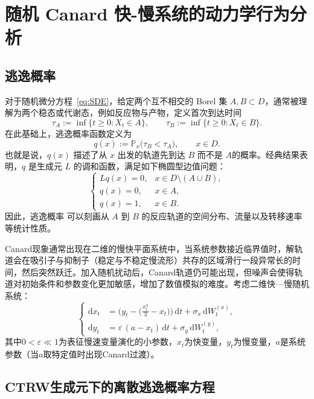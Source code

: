 	
	\section{随机 Canard 快-慢系统的动力学行为分析}
	
	\subsection{逃逸概率}
	
	对于随机微分方程~\eqref{eq:SDE}，给定两个互不相交的 Borel 集 $A,B\subset D$，通常被理解为两个稳态或代谢态，例如反应物与产物，定义首次到达时间
	\[
	\tau_A := \inf\{t\ge0 : X_t\in A\},\qquad 
	\tau_B := \inf\{t\ge0 : X_t\in B\}.
	\]
	在此基础上，逃逸概率函数定义为
	\[
	q(x) := \mathbb{P}_x\big(\tau_B < \tau_A\big),\qquad x\in D.
	\]
	也就是说，$q(x)$ 描述了从 $x$ 出发的轨道先到达 $B$ 而不是 $A$的概率。经典结果表明，$q$ 是生成元 $L$ 的调和函数，满足如下椭圆型边值问题\cite{EV_TPT,EV_TowardsTP}：
	\begin{equation}\label{eq:committor_PDE}
		\begin{cases}
			L q(x) = 0, & x\in D\setminus(A\cup B),\\[1mm]
			q(x) = 0, & x\in A,\\[1mm]
			q(x) = 1, & x\in B.
		\end{cases}
	\end{equation}
	因此，逃逸概率 可以刻画从 $A$ 到 $B$ 的反应轨道的空间分布、流量以及转移速率等统计性质\cite{EV_TPT,EV_TowardsTP,Metzner_TPT_MJP}。
	
	Canard现象通常出现在二维的慢快平面系统中，当系统参数接近临界值时，解轨道会在吸引子与抑制子（稳定与不稳定慢流形）共存的区域滑行一段异常长的时间，然后突然跃迁。加入随机扰动后，Canard轨道仍可能出现，但噪声会使得轨道对初始条件和参数变化更加敏感，增加了数值模拟的难度。考虑二维快—慢随机系统：
	\begin{equation}\label{eq:canard-SDE}
		\begin{cases}
			\mathrm{d}x_t &= \Big(y_t - \big(\tfrac{x_t^3}{3} - x_t\big)\Big)\,\mathrm{d}t + \sigma_x\,\mathrm{d}W_t^{(x)},\\
			\mathrm{d}y_t &= \varepsilon\,(a - x_t)\,\mathrm{d}t + \sigma_y\,\mathrm{d}W_t^{(y)},
		\end{cases}
	\end{equation}
	其中$0<\varepsilon \ll 1$为表征慢速变量演化的小参数，$x_t$为快变量，$y_t$为慢变量，$a$是系统参数（当$a$取特定值时出现Canard过渡）。
	
	\subsection{CTRW生成元下的离散逃逸概率方程}
	
